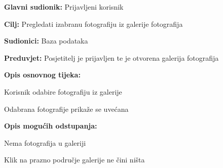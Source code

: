 					\noindent {}
					\begin{packed_item}
						
						\item \textbf{Glavni sudionik: } Prijavljeni korisnik
						\item  \textbf{Cilj:} Pregledati izabranu fotografiju iz galerije fotografija
						\item  \textbf{Sudionici:} Baza podataka
						\item  \textbf{Preduvjet:} Posjetitelj je prijavljen te je otvorena galerija fotografija
						\item  \textbf{Opis osnovnog tijeka:}
						
						\item[] \begin{packed_enum}
							
							\item Korisnik odabire fotografiju iz galerije
							\item Odabrana fotografije prikaže se uvećana
						\end{packed_enum}
						
						\item  \textbf{Opis mogućih odstupanja:}
						
						\item[] \begin{packed_item}
							
							\item[1.a] Nema fotografija u galeriji
							\item[] \begin{packed_enum}
								
								\item Klik na prazno područje galerije ne čini ništa
								
							\end{packed_enum}
							
						\end{packed_item}
					\end{packed_item}
					
